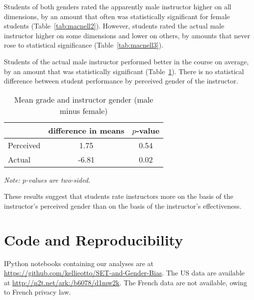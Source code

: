 \documentclass[12pt]{article}
\begin{document}
Students of both genders rated the apparently male instructor higher on all
dimensions, by an amount that often was statistically significant for female students 
(Table~\ref{tab:macnell2}).
However, students rated the actual male instructor higher on some dimensions
and lower on others, by amounts that never rose to statistical significance
(Table~\ref{tab:macnell3}). 

Students of the actual male instructor performed better in the course on average,
by an amount that was statistically significant (Table~\ref{tab:macnell4}). 
There is no statistical difference between student performance by 
perceived gender of the instructor. 

\begin{table}[htbp]
  \centering
  \footnotesize 
  \caption{Mean grade and instructor gender (male minus female)}
    \begin{tabular}{lcc}
    \toprule 
                     & difference in means   & $p$-value    \\
   \midrule
    Perceived &         1.75       & 0.54      \\
    Actual  &            -6.81       & 0.02      \\
    \bottomrule
    \end{tabular}%
 \label{tab:macnell4}%
 
\textit{Note: $p$-values are two-sided.}
\end{table}%
\normalsize

These results suggest that students rate instructors more on the basis of the 
instructor's perceived gender than on the basis of the instructor's effectiveness. 

\section{Code and Reproducibility}
IPython notebooks containing our analyses are at
\url{https://github.com/kellieotto/SET-and-Gender-Bias}.
The US data are available at \url{http://n2t.net/ark:/b6078/d1mw2k}.
The French data are not available, owing to French privacy law.
\end{document}

